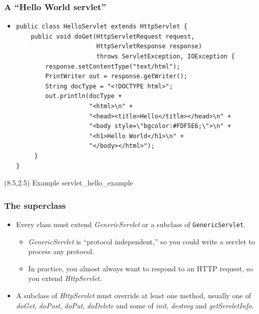 \documentclass[10pt,xcolor=pdflatex]{beamer}
\begin{document}
\begin{frame}[containsverbatim]\frametitle{A “Hello World servlet”}
	\begin{itemize}
    	\item[] \begin{footnotesize} \begin{verbatim} 
public class HelloServlet extends HttpServlet {
    public void doGet(HttpServletRequest request,
                      HttpServletResponse response)
                      throws ServletException, IOException {
        response.setContentType("text/html");
        PrintWriter out = response.getWriter();
        String docType = "<!DOCTYPE html>";
        out.println(docType +
                    "<html>\n" +
                    "<head><title>Hello</title></head>\n" +
                    "<body style=\"bgcolor:#FDF5E6;\">\n" +
                    "<h1>Hello World</h1>\n" +
                    "</body></html>");
     }
}
\end{verbatim} \end{footnotesize}
    \end{itemize}
  \begin{textblock}{6}(8.5,2.5)
    {\footnotesize Example servlet\_hello\_example}
  \end{textblock}
\end{frame}


\begin{frame}\frametitle{The superclass}
	\begin{itemize}
    	\item Every class must extend \emph{GenericServlet} or a subclass of \texttt{GenericServlet}.
		  \begin{itemize} 
            \item \emph{GenericServlet} is “protocol independent,” so you could write a servlet to process any protocol.
		    \item In practice, you almost always want to respond to an HTTP request, so you extend \emph{HttpServlet.}
		  \end{itemize}
		\item A subclass of \emph{HttpServlet} must override at least one method, usually one of \emph{doGet}, \emph{doPost}, \emph{doPut}, \emph{doDelete} and some of \emph{init}, \emph{destroy} and \emph{getServletInfo}.
    \end{itemize}
\end{frame}
\end{document}
